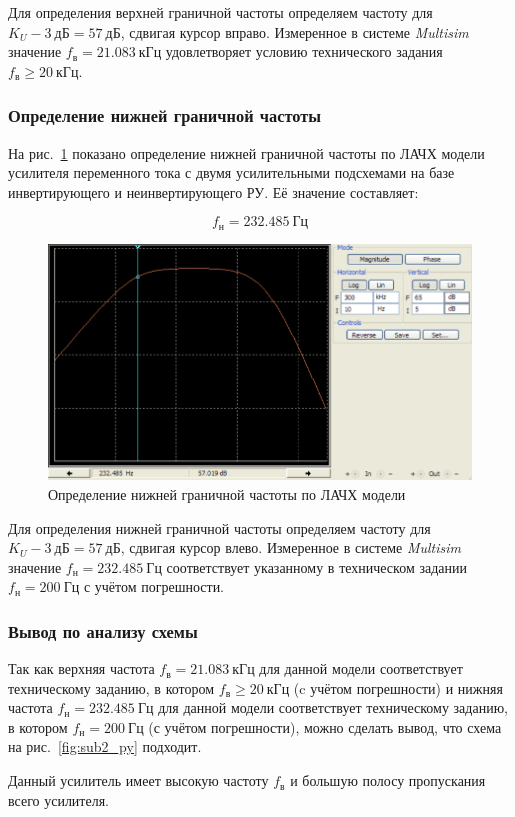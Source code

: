 Для определения верхней граничной частоты 
определяем частоту для $ K_U - 3~дБ = 57~дБ $,
сдвигая курсор вправо. 
Измеренное в системе \textit{Multisim} значение 
$ f_в = 21.083~кГц $ удовлетворяет условию
технического задания $ f_в \ge 20~кГц $.

\subsubsection*{Определение нижней граничной частоты}

На рис.~\ref{fig:plot_f_low_sub2_py} показано 
определение нижней граничной частоты
по ЛАЧХ модели
усилителя переменного тока
с двумя усилительными подсхемами
на базе инвертирующего и неинвертирующего РУ. 
Её значение составляет:

$$ f_н = 232.485~Гц $$

\begin{figure}[H]
	\centering
	\includegraphics[width=0.7\linewidth]{photo/plot_f_low_sub2_py}
	\caption{Определение нижней граничной частоты по ЛАЧХ модели}
	\label{fig:plot_f_low_sub2_py}
\end{figure}

Для определения нижней граничной частоты 
определяем частоту для $ K_U - 3~дБ = 57~дБ $, 
сдвигая курсор влево. 
Измеренное в системе \textit{Multisim} значение 
$ f_н = 232.485~Гц $ соответствует 
указанному в техническом задании $ f_н = 200~Гц $
с учётом погрешности.

\subsubsection*{Вывод по анализу схемы}

Так как 
верхняя частота $ f_в = 21.083~кГц $
для данной модели соответствует техническому заданию,
в котором $ f_в \ge 20~кГц $ (c учётом погрешности) и
нижняя частота $ f_н = 232.485~Гц $
для данной модели соответствует техническому заданию,
в котором $ f_н = 200~Гц $ (с учётом погрешности),
можно сделать вывод, 
что схема на рис.~\ref{fig:sub2_py} подходит.

Данный усилитель имеет высокую частоту $ f_в $ и 
большую полосу пропускания всего усилителя.
